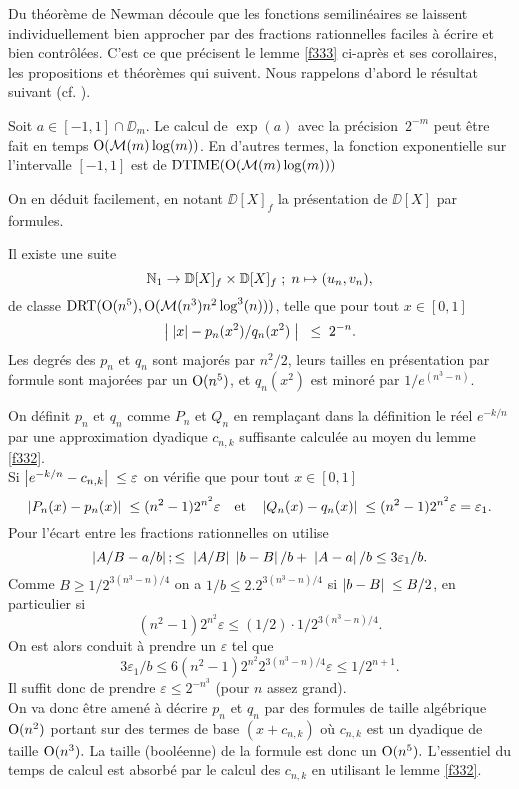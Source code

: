 Du théorème de Newman découle que les fonctions semilinéaires se 
laissent individuellement bien approcher par des fractions rationnelles 
faciles à écrire et bien contrôlées. C'est ce que précisent le 
lemme \ref{f333}  ci-après et ses corollaires, les propositions et 
théorèmes qui suivent. Nous rappelons d'abord le résultat suivant (cf. 
\cite{fBrent}).
\begin{flemma} \label{f332}  
 Soit   $a \in  [-1,1]\cap \DD_m$. Le calcul de  
$\exp(a)$  avec la précision~$2^{-m}$ peut être fait en temps ${\rm O}({{\cal M}}(m)\log(m))$.   
En d'autres termes, la fonction exponentielle sur l'intervalle $[-1,1]$ est de \com ${\rm DTIME}({\rm O}({{\cal M}}(m)\log(m)))$   
\end{flemma} 

On en déduit facilement, en notant $\DD[X]_f$ la présentation de $\DD[X]$ 
par formules.

\begin{flemma} \label{f333}
Il existe une suite 
\[
\mathbb {N}_1 \rightarrow \mathbb {D}[X]_f \times \mathbb {D}[X]_f \; ; \; n \mapsto (u_n, v_n),
\] 
de classe ${\rm DRT}({\rm O}(n^5), {\rm O}({{{\cal M}}}(n^3) n^2 \log^3(n)))$, telle que pour tout   $x \in [0,1]$      
\[
\left|{\;\left|{x}\right| - p_n(x^2)/q_n(x^2) \;}\right| \;\;\leq \;2^{-n}.
\]
Les degrés des \pols $p_n$ et $q_n$ sont majorés par $n^2/2$, leurs tailles en présentation par formule sont majorées par un ${\rm O}(n^5)$,  
et $q_n(x^2)$ est minoré par  $1/e^{(n^3-n)}$.
\end{flemma} 

\proof On définit $p_n$ et  $q_n$  comme   $P_n$  et  $Q_n$  en rempla\c{c}ant 
dans la définition le réel  $e^{-k/n}$ par une approximation  dyadique  
$c_{n,k}$  suffisante calculée au moyen du lemme \ref{f332}. \\ 
Si  $\left|{e^{-k/n}-c_{n,k}}\right|\;\leq \varepsilon$ on vérifie que 
pour tout   $x\in [0,1]$  
\[
\left|{P_n(x) - p_n(x)}\right|\;  \leq  (n^{2}-1) 2^{n^2} \varepsilon  \quad  
\hbox{et}  \quad  \left|{Q_n(x)- q_n(x)}\right|\; \leq  (n^2-1) 2^{n^2} \varepsilon  = \varepsilon_1. 
\]
Pour l'écart entre les fractions rationnelles on utilise
\[
\left|{A/B - a/b}\right|;  \leq \;  
\left|{A/B}\right| \;  \left|{b - B}\right|  / b + \; \left|{A - a}\right|  / b 
\leq   3 \varepsilon_1/ b. 
\]
Comme $ B \geq  1/2^{3(n^3-n)/4} $ on a  $1/b\leq2.2^{3(n^3-n)/4}$ si  
$\left|{b - B}\right|\;\leq  B/2$, en particulier si  
\[
(n^{2}-1) 2^{n^2} \varepsilon \leq (1/2) \cdot 1/2^{3(n^3-n)/4}.
\]
On est alors conduit à prendre un  $\varepsilon $  tel que   
\[
3\varepsilon_1/b\leq 6(n^{2}-1)2^{n^2}2^{3(n^3-n)/4}\varepsilon 
\leq 1/2^{n+1}.
\]
Il suffit donc de prendre  $\varepsilon  \leq  2 ^{-n^3}$ (pour  $n$  assez 
grand).\\
On va donc être amené à décrire   $p_n$  et  $q_n$  par des formules de 
taille  algébrique   ${\rm O}(n^2)$   portant sur des termes de base  $(x+c_{n,k})$  
où  $c_{n,k}$  est un dyadique de taille  ${\rm O}(n^{3}).$ 
La taille (booléenne) de la formule est donc un  ${\rm O}(n^{5}).$ 
L'essentiel du temps de calcul est absorbé par le calcul des  $c_{n,k}$  en 
utilisant le lemme \ref{f332}.  
\eop

